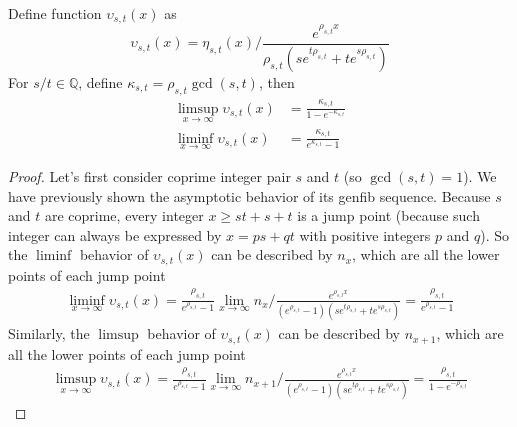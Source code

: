 \documentclass[]{article}
\begin{document}
\vspace{1cm}
\begin{lemma}
	Define function $\upsilon_{s,t}(x)$ as 
	\[
	\upsilon_{s,t}(x) =  \eta_{s,t}(x) \big/ \frac{e^{\rho_{s,t} x}}{\rho_{s,t}(s e^{t\rho_{s,t}} + te^{s\rho_{s,t}})}
	\]
	For $s/t\in\mathbb{Q}$, define $\kappa_{s,t} = \rho_{s,t} \gcd(s, t)$, then
	\begin{align*}
	\limsup_{x\to\infty} \upsilon_{s,t}(x) &= \frac{\kappa_{s,t}}{1 - e^{-\kappa_{s,t}}} \\
	\liminf_{x\to\infty} \upsilon_{s,t}(x) &= \frac{\kappa_{s,t}}{e^{\kappa_{s,t}} - 1}
	\end{align*}
\end{lemma}
\begin{proof}
	Let's first consider coprime integer pair $s$ and $t$ (so $\gcd(s, t) = 1$). We have previously shown the asymptotic behavior of its genfib sequence. Because $s$ and $t$ are coprime, every integer $x \ge st + s + t$ is a jump point (because such integer can always be expressed by $x = ps+qt$ with positive integers $p$ and $q$). So the $\liminf$ behavior of $ \upsilon_{s,t}(x)$ can be described by $n_x$, which are all the lower points of each jump point
	\begin{align*}
	\liminf_{x\to\infty} \upsilon_{s,t}(x) = \frac{\rho_{s,t}}{e^{\rho_{s,t}} - 1} \lim_{x\to\infty} n_x  \big/ \frac{e^{\rho_{s,t} x}}{( e^{\rho_{s,t}} - 1)(s e^{t\rho_{s,t}} + t e^{s\rho_{s,t}})}  = \frac{\rho_{s,t}}{e^{\rho_{s,t}} - 1}
	\end{align*}
	Similarly, the $\limsup$ behavior of $ \upsilon_{s,t}(x)$ can be described by $n_{x+1}$, which are all the lower points of each jump point
	\begin{align*}
	\limsup_{x\to\infty} \upsilon_{s,t}(x) = \frac{\rho_{s,t}}{e^{\rho_{s,t}} - 1} \lim_{x\to\infty} n_{x+1}  \big/ \frac{e^{\rho_{s,t} x}}{( e^{\rho_{s,t}} - 1)(s e^{t\rho_{s,t}} + t e^{s\rho_{s,t}})}  = \frac{\rho_{s,t}}{1 - e^{-\rho_{s,t}}}
	\end{align*}
	

\end{proof}
\end{document}

